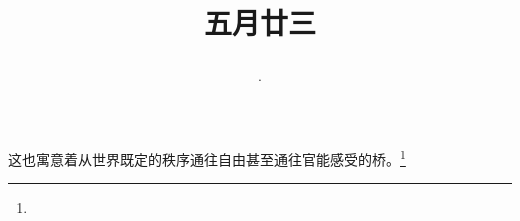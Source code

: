 \title{\date[d=28,m=6,y=2024][year:cn-y,年,month:cn,day:cn,日,·,weekday]·五月廿三 }
这也寓意着从世界既定的秩序通往自由甚至通往官能感受的桥。\footnote{ }

